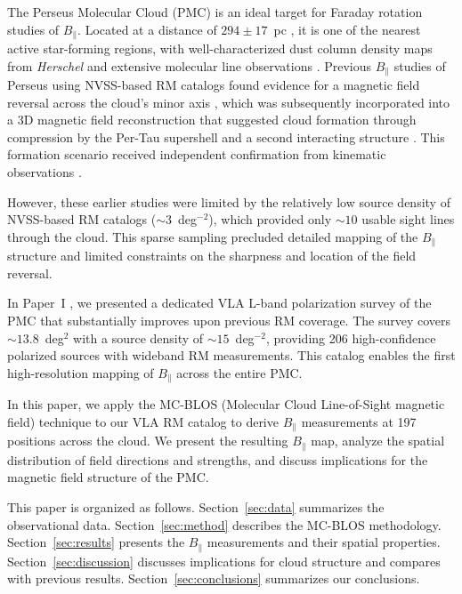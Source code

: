 \documentclass[twocolumn]{aastex701}
\begin{document}
The Perseus Molecular Cloud (PMC) is an ideal target for Faraday rotation studies of $B_\parallel$. Located at a distance of $294 \pm 17$~pc \citep{zucker2018}, it is one of the nearest active star-forming regions, with well-characterized dust column density maps from \textit{Herschel} \citep{andre2010} and extensive molecular line observations \citep{ridge2006}. Previous $B_\parallel$ studies of Perseus using NVSS-based RM catalogs \citep{taylor2009} found evidence for a magnetic field reversal across the cloud's minor axis \citep{tahani2018}, which was subsequently incorporated into a 3D magnetic field reconstruction that suggested cloud formation through compression by the Per-Tau supershell and a second interacting structure \citep{tahani2022b}. This formation scenario received independent confirmation from kinematic observations \citep{kounkel2022}.

However, these earlier studies were limited by the relatively low source density of NVSS-based RM catalogs ($\sim 3$~deg$^{-2}$), which provided only $\sim 10$ usable sight lines through the cloud. This sparse sampling precluded detailed mapping of the $B_\parallel$ structure and limited constraints on the sharpness and location of the field reversal.

In Paper~I \citep{hajizadeh2026comprehensive}, we presented a dedicated VLA L-band polarization survey of the PMC that substantially improves upon previous RM coverage. The survey covers $\sim 13.8$~deg$^2$ with a source density of $\sim 15$~deg$^{-2}$, providing 206 high-confidence polarized sources with wideband RM measurements. This catalog enables the first high-resolution mapping of $B_\parallel$ across the entire PMC.

In this paper, we apply the MC-BLOS (Molecular Cloud Line-of-Sight magnetic field) technique \citep{tahani2018,tahani2025mcblos} to our VLA RM catalog to derive $B_\parallel$ measurements at 197 positions across the cloud. We present the resulting $B_\parallel$ map, analyze the spatial distribution of field directions and strengths, and discuss implications for the magnetic field structure of the PMC.

This paper is organized as follows. Section~\ref{sec:data} summarizes the observational data. Section~\ref{sec:method} describes the MC-BLOS methodology. Section~\ref{sec:results} presents the $B_\parallel$ measurements and their spatial properties. Section~\ref{sec:discussion} discusses implications for cloud structure and compares with previous results. Section~\ref{sec:conclusions} summarizes our conclusions.
\end{document}
